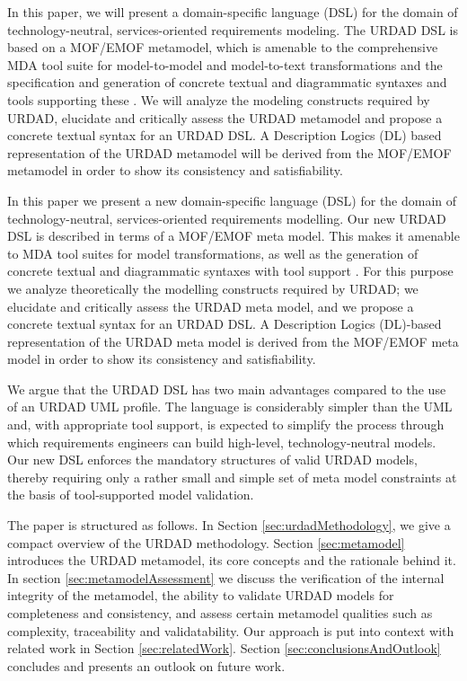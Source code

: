 In this paper, we will present a domain-specific language (DSL) for the domain of technology-neutral, services-oriented requirements modeling. The URDAD DSL is based on a MOF/EMOF metamodel, which is amenable to the comprehensive MDA tool suite for model-to-model and model-to-text transformations and the specification and generation of concrete textual and diagrammatic syntaxes and tools supporting these \cite{gronback_model_2008}. We will analyze the modeling constructs required by URDAD, elucidate and critically assess the URDAD metamodel and propose a concrete textual syntax for an URDAD DSL. A Description Logics (DL) based representation of the URDAD metamodel will be derived from the MOF/EMOF metamodel in order to show its consistency and satisfiability.

In this paper we present a new domain-specific language (DSL) for the domain of technology-neutral, services-oriented 
requirements modelling. Our new URDAD DSL is described in terms of a MOF/EMOF meta model. This makes it amenable to MDA tool 
suites for model transformations, as well as the generation of concrete textual and diagrammatic syntaxes with 
tool support \cite{gronback_model_2008}. For this purpose we analyze theoretically the modelling constructs required 
by URDAD; we elucidate and critically assess the URDAD meta model, and we propose a concrete textual syntax for an URDAD 
DSL. A Description Logics (DL)-based representation of the URDAD meta model is derived from the MOF/EMOF meta model 
in order to show its consistency and satisfiability.

We argue that the URDAD DSL has two main advantages compared to the use of an URDAD UML profile. The language is considerably simpler than the UML and, with appropriate tool support, is expected to simplify the process through which requirements engineers can build high-level, technology-neutral models. Our new DSL enforces the mandatory structures of valid URDAD models, thereby requiring only a rather small and simple set of meta model constraints at the basis of tool-supported model validation. 

The paper is structured as follows. In Section \ref{sec:urdadMethodology}, we give a compact overview of the URDAD methodology. Section \ref{sec:metamodel} introduces the URDAD metamodel, its core concepts and the rationale behind it. In section \ref{sec:metamodelAssessment} we discuss the verification of the internal integrity of the metamodel, the ability to validate URDAD models for completeness and consistency, and assess certain metamodel qualities such as complexity, traceability and validatability. Our approach is put into context with related work in Section \ref{sec:relatedWork}. Section \ref{sec:conclusionsAndOutlook} concludes and presents an outlook on future work.
